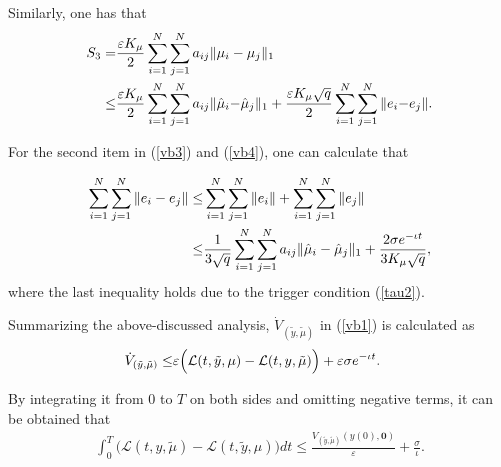 \documentclass[final,5p,times,twocolumn,authoryear]{elsarticle}
\begin{document}
	Similarly, one has that
	\begin{align}
		S_{3}
		=
		&\frac{\varepsilon K_\mu}{2} \sum_{i=1}^{N} \sum_{j=1}^N a_{ij}\|\mu_i-\mu_j\|_1\notag\\
		\le	
		&\frac{\varepsilon K_\mu}{2} \sum_{i=1}^{N} \sum_{j=1}^N a_{ij}\|\hat\mu_i{-}\hat\mu_j\|_1 + \frac{\varepsilon K_\mu\sqrt{q}}{2} \sum_{i=1}^{N} \sum_{j=1}^N \|e_i{-}e_j\|.\label{vb4}
	\end{align}
	
	For the second item in (\ref{vb3}) and (\ref{vb4}), one can calculate that
	
	\begin{align}
		\sum_{i=1}^{N}  \sum_{j=1}^N  \|e_i-e_j\|
		\le& \sum_{i=1}^{N}  \sum_{j=1}^N  \|e_i\| + \sum_{i=1}^{N}  \sum_{j=1}^N  \|e_j\|\notag\\
		\le &\frac{1}{3\sqrt{q}}\sum_{i=1}^{N} \sum_{j=1}^N a_{ij} \|\hat\mu_i-\hat\mu_j\|_1 + \frac{2\sigma e^{-\iota t}}{3K_\mu\sqrt{q}} ,	
	\end{align}
	where the last inequality holds due to the trigger condition (\ref{tau2}).
	
	Summarizing the above-discussed analysis,	$\dot{V}_{(\tilde{y}, \tilde{\mu})}$ in (\ref{vb1}) is calculated as
	\begin{align}
		\dot{V}_{(\tilde{y}, \tilde{\mu})}
		\le
		& \varepsilon \Big(\mathcal{L}(t,\tilde{y},\mu) - \mathcal{L}(t,y,\tilde{\mu})\Big) + \varepsilon\sigma e^{-\iota t}.\notag
	\end{align}
	
	By integrating it from $0$ to $T$ on both sides and omitting negative terms, it can be obtained that
	\begin{align}
		\int_{0}^{T} \Big( \mathcal{L}(t,y,\tilde{\mu}){-}\mathcal{L}(t,\tilde{y},\mu)\Big) dt {\le} \frac{V_{(\tilde{y}, \tilde{\mu})}(y(0), \boldsymbol{0})}{\varepsilon} {+} \frac{\sigma}{\iota}.
	\end{align}
	
\end{document}
